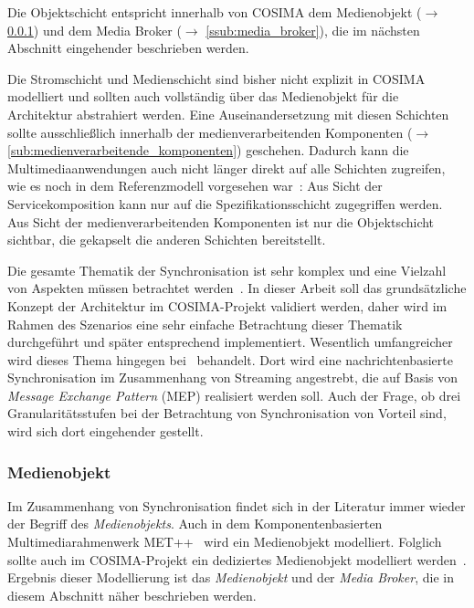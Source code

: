 
  Die Objektschicht entspricht innerhalb von COSIMA dem Medienobjekt ($\to$ \ref{ssub:medienobjekt}) und dem Media Broker ($\to$ \ref{ssub:media_broker}), die im nächsten Abschnitt eingehender beschrieben werden.
  
  Die Stromschicht und Medienschicht sind bisher nicht explizit in COSIMA modelliert und sollten auch vollständig über das Medienobjekt für die Architektur abstrahiert werden. Eine Auseinandersetzung mit diesen Schichten sollte ausschließlich innerhalb der medienverarbeitenden Komponenten ($\to$ \ref{sub:medienverarbeitende_komponenten}) geschehen. Dadurch kann die Multimediaanwendungen auch nicht länger direkt auf alle Schichten zugreifen, wie es noch in dem Referenzmodell vorgesehen war~\citep[S. 13]{blakowski1996mss}: Aus Sicht der Servicekomposition kann nur auf die Spezifikationsschicht zugegriffen werden. Aus Sicht der medienverarbeitenden Komponenten ist nur die Objektschicht sichtbar, die gekapselt die anderen Schichten bereitstellt.

  Die gesamte Thematik der Synchronisation ist sehr komplex und eine Vielzahl von Aspekten müssen betrachtet werden~\citep[S. 27ff]{bericht}. In dieser Arbeit soll das grundsätzliche Konzept der Architektur im COSIMA-Projekt validiert werden, daher wird im Rahmen des Szenarios eine sehr einfache Betrachtung dieser Thematik durchgeführt und später entsprechend implementiert. Wesentlich umfangreicher wird dieses Thema hingegen bei~\citep{antons09} behandelt. Dort wird eine nachrichtenbasierte Synchronisation im Zusammenhang von Streaming angestrebt, die auf Basis von \emph{Message Exchange Pattern} (MEP) realisiert werden soll. Auch der Frage, ob drei Granularitätsstufen bei der Betrachtung von Synchronisation von Vorteil sind, wird sich dort eingehender gestellt.


  
\subsubsection{Medienobjekt} %
\label{ssub:medienobjekt}

  Im Zusammenhang von Synchronisation findet sich in der Literatur immer wieder der Begriff des \emph{Medienobjekts}. Auch in dem Komponentenbasierten Multimediarahmenwerk MET++~\citep{ackermann1994dai} wird ein Medienobjekt modelliert. Folglich sollte auch im COSIMA-Projekt ein dediziertes Medienobjekt modelliert werden~\citep{bericht}. Ergebnis dieser Modellierung ist das \emph{Medienobjekt} und der \emph{Media Broker}, die in diesem Abschnitt näher beschrieben werden.


